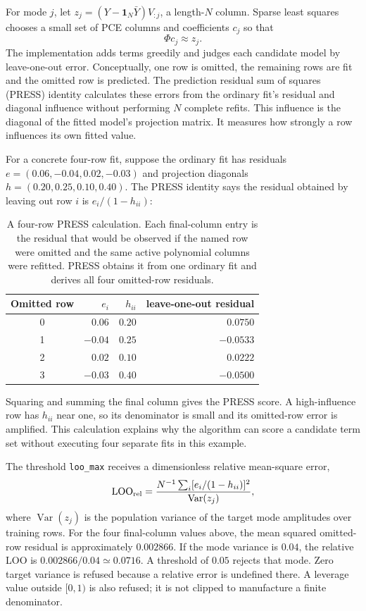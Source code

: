 \documentclass[10pt,aps,prd,twocolumn,nofootinbib]{revtex4-2}
\newcommand{\code}[1]{\texttt{#1}}
\begin{document}
For mode \(j\), let
$z_j=(Y-\mathbf 1_N\bar Y)V_{:j}$, a length-$N$ column.  Sparse least squares
chooses a small set of PCE columns and coefficients \(c_j\) so that
\begin{equation*}
 \Phi c_j\approx z_j.
\end{equation*}
The implementation adds terms greedily and judges each candidate model by
leave-one-out error.  Conceptually, one row is omitted, the remaining rows are
fit and the omitted row is predicted.  The prediction residual sum of
squares (PRESS) identity calculates these errors from the ordinary fit's
residual and diagonal influence without performing \(N\) complete refits.  This
influence is the diagonal of the fitted model's projection matrix.  It measures how strongly
a row influences its own fitted value.

For a concrete four-row fit, suppose the ordinary fit has residuals
$e=(0.06,-0.04,0.02,-0.03)$ and projection diagonals
$h=(0.20,0.25,0.10,0.40)$.  The PRESS identity says the residual obtained by
leaving out row $i$ is $e_i/(1-h_{ii})$:
\begin{table}[t]
\centering
\begin{tabular}{c@{\qquad}r@{\qquad}r@{\qquad}r}
\toprule
Omitted row & $e_i$ & $h_{ii}$ & leave-one-out residual \\
\midrule
0 & $0.06$ & $0.20$ & $0.0750$ \\
1 & $-0.04$ & $0.25$ & $-0.0533$ \\
2 & $0.02$ & $0.10$ & $0.0222$ \\
3 & $-0.03$ & $0.40$ & $-0.0500$ \\
\bottomrule
\end{tabular}
\caption{A four-row PRESS calculation.  Each final-column entry is the
residual that would be observed if the named row were omitted and the same
active polynomial columns were refitted.  PRESS obtains it from one ordinary
fit and derives all four omitted-row residuals.}
\label{tab:press-example}
\end{table}
Squaring and summing the final column gives the PRESS score.  A high-influence
row has $h_{ii}$ near one, so its denominator is small and its omitted-row
error is amplified.  This calculation explains why the algorithm can score a
candidate term set without executing four separate fits in this example.

The threshold \code{loo\_max} receives a dimensionless relative mean-square
error,
\begin{equation*}
 \operatorname{LOO}_{\rm rel}
 =\frac{N^{-1}\sum_i[e_i/(1-h_{ii})]^2}
        {\operatorname{Var}(z_j)},
\end{equation*}
where $\operatorname{Var}(z_j)$ is the population variance of the target mode
amplitudes over training rows.  For the four final-column values above, the
mean squared omitted-row residual is approximately $0.002866$.  If the mode
variance is $0.04$, the relative LOO is $0.002866/0.04\simeq0.0716$.  A
threshold of $0.05$ rejects that mode.  Zero target variance is refused because
a relative error is undefined there.  A leverage value outside $[0,1)$ is also
refused; it is not clipped to manufacture a finite denominator.
\end{document}
